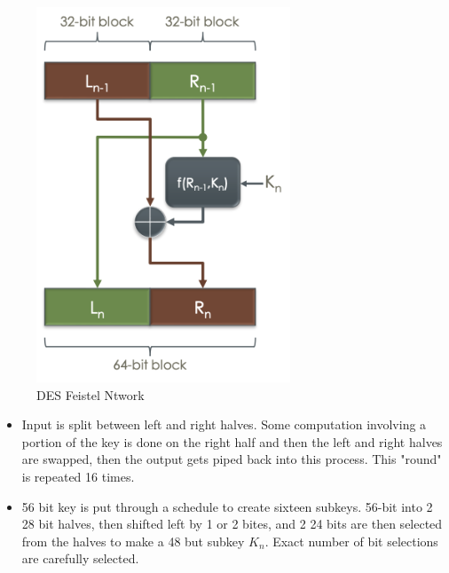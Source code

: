 \documentclass[../notes.tex]{subfiles}
\begin{document}
\begin{figure}[H]
    \centering
    \includegraphics[width=0.8\linewidth]{img/image_2023-02-10-00-07-50.png}
    \caption{DES Feistel Ntwork}
\end{figure}
\begin{itemize}
    \item Input is split between left and right halves. Some computation involving a portion of the key is done on the right half and then the left and right halves are swapped, then the output gets piped back into this process. This "round" is repeated 16 times.
    \item 56 bit key is put through a schedule to create sixteen subkeys. 56-bit into 2 28 bit halves, then shifted left by 1 or 2 bites, and 2 24 bits are then selected from the halves to make a 48 but subkey $ K_n $. Exact number of bit selections are carefully selected.
\end{itemize}
\end{document}
